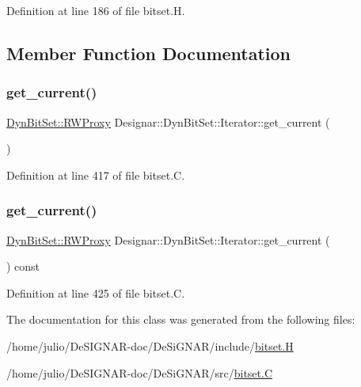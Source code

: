 Definition at line 186 of file bitset.\+H.



\subsection{Member Function Documentation}
\mbox{\label{class_designar_1_1_dyn_bit_set_1_1_iterator_a413eba67b23a9400666c18845bbe795a}} 
\subsubsection{\texorpdfstring{get\+\_\+current()}{get\_current()}\hspace{0.1cm}{\footnotesize\ttfamily [1/2]}}
{\footnotesize\ttfamily \hyperlink{class_designar_1_1_dyn_bit_set_1_1_r_w_proxy}{Dyn\+Bit\+Set\+::\+R\+W\+Proxy} Designar\+::\+Dyn\+Bit\+Set\+::\+Iterator\+::get\+\_\+current (\begin{DoxyParamCaption}{ }\end{DoxyParamCaption})}



Definition at line 417 of file bitset.\+C.

\mbox{\label{class_designar_1_1_dyn_bit_set_1_1_iterator_a034af8ec4f70d792837cab4923799e9f}} 
\subsubsection{\texorpdfstring{get\+\_\+current()}{get\_current()}\hspace{0.1cm}{\footnotesize\ttfamily [2/2]}}
{\footnotesize\ttfamily \hyperlink{class_designar_1_1_dyn_bit_set_1_1_r_w_proxy}{Dyn\+Bit\+Set\+::\+R\+W\+Proxy} Designar\+::\+Dyn\+Bit\+Set\+::\+Iterator\+::get\+\_\+current (\begin{DoxyParamCaption}{ }\end{DoxyParamCaption}) const}



Definition at line 425 of file bitset.\+C.



The documentation for this class was generated from the following files\+:\begin{DoxyCompactItemize}
\item 
/home/julio/\+De\+S\+I\+G\+N\+A\+R-\/doc/\+De\+Si\+G\+N\+A\+R/include/\hyperlink{bitset_8_h}{bitset.\+H}\item 
/home/julio/\+De\+S\+I\+G\+N\+A\+R-\/doc/\+De\+Si\+G\+N\+A\+R/src/\hyperlink{bitset_8_c}{bitset.\+C}\end{DoxyCompactItemize}
